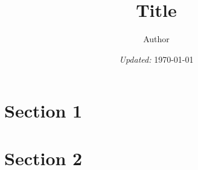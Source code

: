 \documentclass[11pt]{article}
\title{ Title}
\author{ Author }
\date{\textit{Updated:} \today}
\begin{document}
	\maketitle	
	\pagebreak
	
	
	
	\section{Section 1}
	
	
	\section{Section 2}
	
	
	\appendix
	
	
\end{document}
